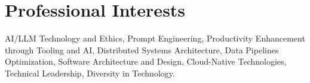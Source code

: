 
\section{Professional Interests}
\footnotesize{AI/LLM Technology and Ethics, Prompt Engineering, Productivity Enhancement through Tooling
    and AI, Distributed Systems Architecture, Data Pipelines Optimization, Software Architecture and
    Design, Cloud-Native Technologies, Technical Leadership, Diversity in Technology.}